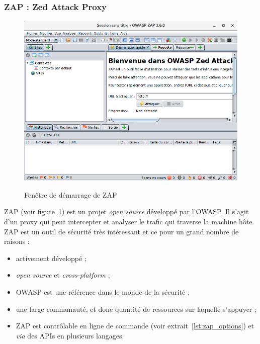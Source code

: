 \subsubsection{ZAP : Zed Attack Proxy}
\begin{figure}
	{\includegraphics[width=\textwidth]{images/zap_acceuil}}
	\centering
	\caption{Fenêtre de démarrage de ZAP}
	\label{fig:zap_acceuil}
\end{figure}
ZAP\cite{zap} (voir figure~\ref{fig:zap_acceuil}) est un projet \textit{open source} développé par l'OWASP\cite{owasp}. Il s'agit d'un proxy qui peut intercepter et analyser le trafic qui traverse la machine hôte. ZAP est un outil de sécurité très intéressant et ce pour un grand nombre de raisons :
\begin{itemize}
	\item activement développé\cite{zap_git} ;
	\item \textit{open source} et \textit{cross-platform} ;
	\item OWASP est une référence dans le monde de la sécurité ;
	\item une large communauté, et donc quantité de ressources sur laquelle s'appuyer ;
	\item ZAP est contrôlable en ligne de commande (voir extrait~\ref{lst:zap_options}) et \textit{via} des APIs en plusieurs langages.
\end{itemize}

